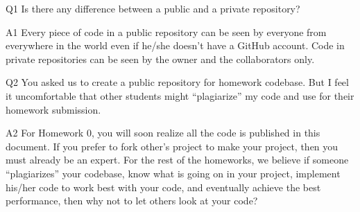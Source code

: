\begin{qa}

\item[Q1] Is there any difference between a public and a private repository?

\item[A1] Every piece of code in a public repository can be seen by everyone
from everywhere in the world even if he/she doesn't have a GitHub account. Code
in private repositories can be seen by the owner and the collaborators only.

\item[Q2] You asked us to create a public repository for homework codebase. But
I feel it uncomfortable that other students might ``plagiarize'' my code and use
for their homework submission.

\item[A2] For Homework 0, you will soon realize all the code is published
in this document. If you prefer to fork other's project to make your
project, then you must already be an expert. For the rest of the homeworks, we
believe if someone ``plagiarizes'' your codebase, know what is going on in your
project, implement his/her code to work best with your code, and eventually
achieve the best performance, then why not to let others look at your code?

\end{qa}

